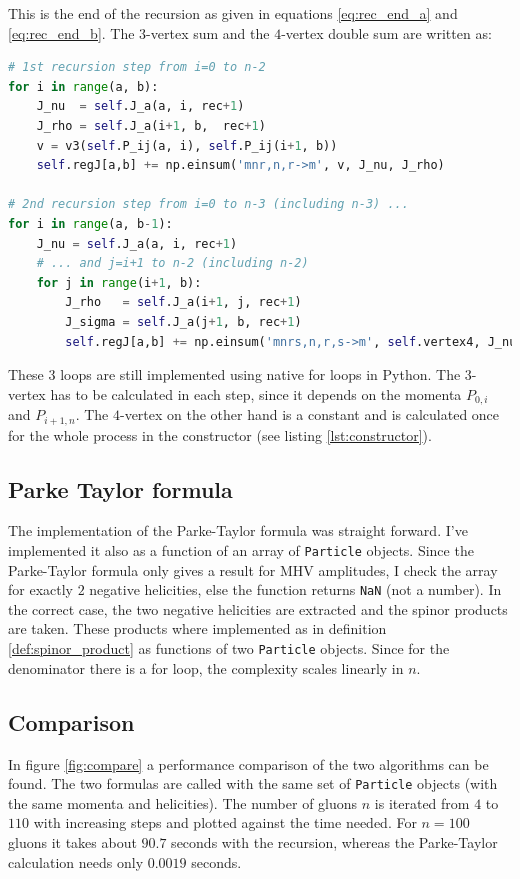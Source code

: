 \documentclass{article}
\theoremstyle{definition}
\def\code#1{\texttt{#1}}
\numberwithin{equation}{section}
\begin{document}
This is the end of the recursion as given in equations \eqref{eq:rec_end_a} and \eqref{eq:rec_end_b}. The $3$-vertex sum and the $4$-vertex double sum are written as:

\begin{lstlisting}[language=Python, label=lst:loops, caption=Sums of the interaction vertices]
# 1st recursion step from i=0 to n-2
for i in range(a, b):
    J_nu  = self.J_a(a, i, rec+1)
    J_rho = self.J_a(i+1, b,  rec+1)
    v = v3(self.P_ij(a, i), self.P_ij(i+1, b))
    self.regJ[a,b] += np.einsum('mnr,n,r->m', v, J_nu, J_rho)

# 2nd recursion step from i=0 to n-3 (including n-3) ...
for i in range(a, b-1):
    J_nu = self.J_a(a, i, rec+1)
    # ... and j=i+1 to n-2 (including n-2)
    for j in range(i+1, b):
        J_rho   = self.J_a(i+1, j, rec+1)
        J_sigma = self.J_a(j+1, b, rec+1)
        self.regJ[a,b] += np.einsum('mnrs,n,r,s->m', self.vertex4, J_nu, J_rho, J_sigma)
\end{lstlisting}

These 3 loops are still implemented using native for loops in Python. The $3$-vertex has to be calculated in each step, since it depends on the momenta $P_{0,i}$ and $P_{i+1,n}$. The $4$-vertex on the other hand is a constant and is calculated once for the whole process in the constructor (see listing \ref{lst:constructor}).

\subsection{Parke Taylor formula}

The implementation of the Parke-Taylor formula was straight forward. I've implemented it also as a function of an array of \code{Particle} objects. Since the Parke-Taylor formula only gives a result for MHV amplitudes, I check the array for exactly $2$ negative helicities, else the function returns \code{NaN} (not a number). In the correct case, the two negative helicities are extracted and the spinor products are taken. These products where implemented as in definition \ref{def:spinor_product} as functions of two \code{Particle} objects. Since for the denominator there is a for loop, the complexity scales linearly in $n$.

\subsection{Comparison}

In figure \ref{fig:compare} a performance comparison of the two algorithms can be found. The two formulas are called with the same set of \code{Particle} objects (with the same momenta and helicities). The number of gluons $n$ is iterated from $4$ to $110$ with increasing steps and plotted against the time needed. For $n=100$ gluons it takes about $90.7$ seconds with the recursion, whereas the Parke-Taylor calculation needs only $0.0019$ seconds.
\end{document}
